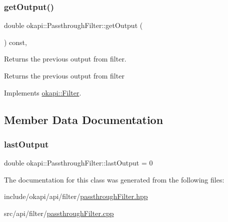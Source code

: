 \subsubsection{\texorpdfstring{getOutput()}{getOutput()}}
{\footnotesize\ttfamily double okapi\+::\+Passthrough\+Filter\+::get\+Output (\begin{DoxyParamCaption}{ }\end{DoxyParamCaption}) const\hspace{0.3cm}{\ttfamily [override]}, {\ttfamily [virtual]}}

Returns the previous output from filter.

\begin{DoxyReturn}{Returns}
the previous output from filter 
\end{DoxyReturn}


Implements \mbox{\hyperlink{classokapi_1_1Filter_a3469cd4bc108f8accf300d9f5cc9f42f}{okapi\+::\+Filter}}.



\subsection{Member Data Documentation}
\mbox{\label{classokapi_1_1PassthroughFilter_af343f68dc96aad3f4342909047331bc4}} 
\subsubsection{\texorpdfstring{lastOutput}{lastOutput}}
{\footnotesize\ttfamily double okapi\+::\+Passthrough\+Filter\+::last\+Output = 0\hspace{0.3cm}{\ttfamily [protected]}}



The documentation for this class was generated from the following files\+:\begin{DoxyCompactItemize}
\item 
include/okapi/api/filter/\mbox{\hyperlink{passthroughFilter_8hpp}{passthrough\+Filter.\+hpp}}\item 
src/api/filter/\mbox{\hyperlink{passthroughFilter_8cpp}{passthrough\+Filter.\+cpp}}\end{DoxyCompactItemize}
